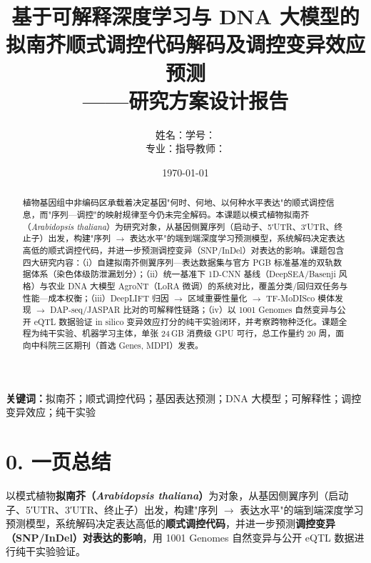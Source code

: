 \documentclass[UTF8,11pt,a4paper]{ctexart}
\title{\textbf{基于可解释深度学习与 DNA 大模型的\\拟南芥顺式调控代码解码及调控变异效应预测\\——研究方案设计报告}}
\author{姓名：\underline{\hspace{2cm}}\quad 学号：\underline{\hspace{2.8cm}}\\[0.4em]
专业：\underline{\hspace{2cm}}\quad 指导教师：\underline{\hspace{2cm}}}
\date{\today}
\begin{document}
\maketitle

\begin{abstract}
\noindent
植物基因组中非编码区承载着决定基因"何时、何地、以何种水平表达"的顺式调控信息，而"序列—调控"的映射规律至今仍未完全解码。本课题以模式植物拟南芥（\emph{Arabidopsis thaliana}）为研究对象，从基因侧翼序列（启动子、5′UTR、3′UTR、终止子）出发，构建"序列 $\rightarrow$ 表达水平"的端到端深度学习预测模型，系统解码决定表达高低的顺式调控代码，并进一步预测调控变异（SNP/InDel）对表达的影响。课题包含四大研究内容：（i）自建拟南芥侧翼序列—表达数据集与官方 PGB 标准基准的双轨数据体系（染色体级防泄漏划分）；（ii）统一基准下 1D-CNN 基线（DeepSEA/Basenji 风格）与农业 DNA 大模型 AgroNT（LoRA 微调）的系统对比，覆盖分类/回归双任务与性能—成本权衡；（iii）DeepLIFT 归因 $\rightarrow$ 区域重要性量化 $\rightarrow$ TF-MoDISco 模体发现 $\rightarrow$ DAP-seq/JASPAR 比对的可解释性链路；（iv）以 1001 Genomes 自然变异与公开 eQTL 数据验证 in silico 变异效应打分的纯干实验闭环，并考察跨物种泛化。课题全程为纯干实验、机器学习主体，单张 24\,GB 消费级 GPU 可行，总工作量约 20 周，面向中科院三区期刊（首选 Genes, MDPI）发表。
\end{abstract}

\vspace{0.5em}
\noindent\textbf{关键词：}拟南芥；顺式调控代码；基因表达预测；DNA 大模型；可解释性；调控变异效应；纯干实验

\tableofcontents
\newpage

\section*{0. 一页总结}

以模式植物\textbf{拟南芥（\emph{Arabidopsis thaliana}）}为对象，从基因侧翼序列（启动子、5′UTR、3′UTR、终止子）出发，构建"序列 $\rightarrow$ 表达水平"的端到端深度学习预测模型，系统解码决定表达高低的\textbf{顺式调控代码}，并进一步预测\textbf{调控变异（SNP/InDel）对表达的影响}，用 1001 Genomes 自然变异与公开 eQTL 数据进行纯干实验验证。
\end{document}
